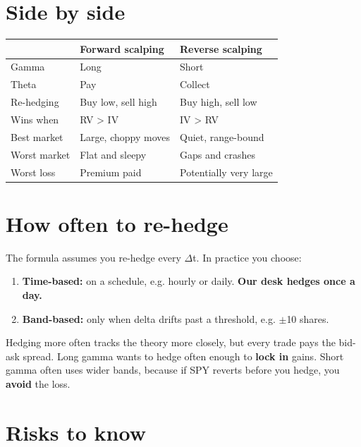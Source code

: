 \documentclass{article}
\begin{document}
\section{Side by side}

\begin{center}\small
\begin{tabularx}{\linewidth}{l >{\raggedright\arraybackslash}X >{\raggedright\arraybackslash}X}
\toprule
\textbf{} & \textbf{Forward scalping} & \textbf{Reverse scalping} \\
\midrule
Gamma & Long & Short \\
Theta & Pay & Collect \\
Re-hedging & Buy low, sell high & Buy high, sell low \\
Wins when & RV > IV & IV > RV \\
Best market & Large, choppy moves & Quiet, range-bound \\
Worst market & Flat and sleepy & Gaps and crashes \\
Worst loss & Premium paid & Potentially very large \\
\bottomrule
\end{tabularx}
\end{center}

\section{How often to re-hedge}

The formula assumes you re-hedge every \ensuremath{\Delta}t. In practice you choose:

\begin{enumerate}

\item \textbf{Time-based:} on a schedule, e.g. hourly or daily. \textbf{Our desk hedges once a day.}

\item \textbf{Band-based:} only when delta drifts past a threshold, e.g. \ensuremath{\pm}10 shares.

\end{enumerate}

Hedging more often tracks the theory more closely, but every trade pays the bid-ask spread. Long gamma wants to hedge often enough to \textbf{lock in} gains. Short gamma often uses wider bands, because if SPY reverts before you hedge, you \textbf{avoid} the loss.

\section{Risks to know}
\end{document}
